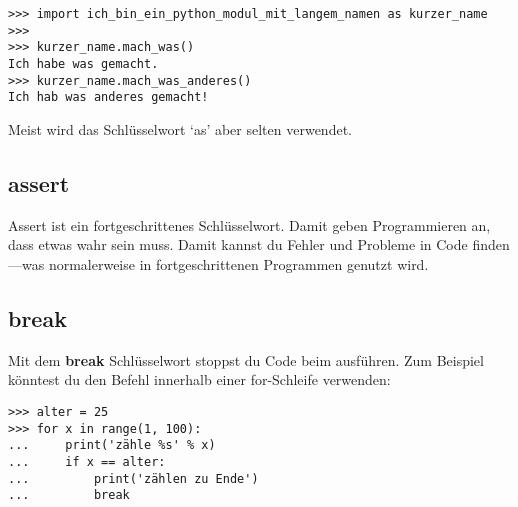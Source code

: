 
\begin{Verbatim}[frame=single]
>>> import ich_bin_ein_python_modul_mit_langem_namen as kurzer_name
>>>
>>> kurzer_name.mach_was()
Ich habe was gemacht.
>>> kurzer_name.mach_was_anderes()
Ich hab was anderes gemacht!
\end{Verbatim}

\noindent
Meist wird das Schlüsselwort `as' aber selten verwendet.

\subsection*{assert}

Assert ist ein fortgeschrittenes Schlüsselwort. Damit geben Programmieren an, dass etwas wahr sein muss. Damit kannst du Fehler und Probleme in Code finden---was normalerweise in fortgeschrittenen Programmen genutzt wird.

\subsection*{break}

Mit dem \textbf{break} Schlüsselwort stoppst du Code beim ausführen. Zum Beispiel könntest du den Befehl innerhalb einer for-Schleife verwenden:

\begin{Verbatim}[frame=single]
>>> alter = 25
>>> for x in range(1, 100):
...     print('zähle %s' % x)
...     if x == alter:
...         print('zählen zu Ende')
...         break
\end{Verbatim}

